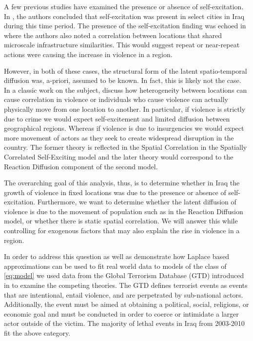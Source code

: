 \documentclass[11pt]{isuthesis}
\begin{document}
A few previous studies have examined the presence or absence of self-excitation.  In \cite{lewis2012self}, the authors concluded that self-excitation was present in select cities in Iraq during this time period.  The presence of the self-excitation finding was echoed in \cite{braithwaite2015battle} where the authors also noted a correlation between locations that shared microscale infrastructure similarities.  This would suggest repeat or near-repeat actions were causing the increase in violence in a region.

However, in both of these cases, the structural form of the latent spatio-temporal diffusion was, a-priori, assumed to be known.  In fact, this is likely not the case. In a classic work on the subject, \cite{midlarsky1980violence} discuss how heterogeneity between locations can cause correlation in violence or individuals who cause violence can actually physically move from one location to another.  In particular, if violence is strictly due to crime we would expect self-excitement and limited diffusion between geographical regions.  Whereas if violence is due to insurgencies we would expect more movement of actors as they seek to create widespread disruption in the country.
The former theory is reflected in the Spatial Correlation in the Spatially Correlated Self-Exciting model and the later theory would correspond to the Reaction Diffusion component of the second model.  

The overarching goal of this analysis, thus, is to determine whether in Iraq the growth of violence in fixed locations was due to the presence or absence of self-excitation.  Furthermore, we want to determine whether the latent diffusion of violence is due to the movement of population such as in the Reaction Diffusion model, or whether there is static spatial correlation.  We will answer this while controlling for exogenous factors that may also explain the rise in violence in a region.


In order to address this question as well as demonstrate how Laplace based approximations can be used to fit real world data to models of the class of \eqref{eq:model} we used data from the Global Terrorism Database (GTD) introduced in \cite{lafree2007introducing} to examine the competing theories.  The GTD defines terrorist events as events that are intentional, entail violence, and are perpetrated by sub-national actors.  Additionally, the event must be aimed at obtaining a political, social, religions, or economic goal and must be conducted in order to coerce or intimidate a larger actor outside of the victim.  The majority of lethal events in Iraq from 2003-2010 fit the above category.
\end{document}
